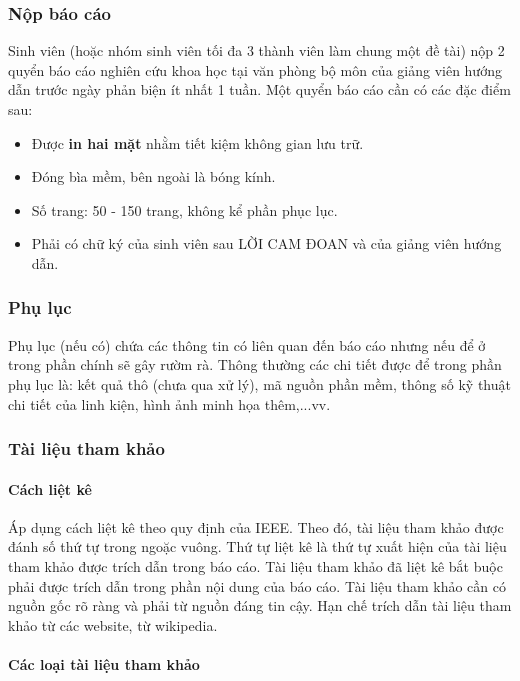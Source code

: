 \documentclass{article} %
\begin{document}
\subsubsection{Nộp báo cáo}
\vspace{-35pt}
Sinh viên (hoặc nhóm sinh viên tối đa 3 thành viên làm chung một đề tài) nộp 2 quyển báo cáo nghiên cứu khoa học tại
văn phòng bộ môn của giảng viên hướng dẫn trước ngày phản biện ít nhất 1 tuần. Một quyển báo cáo cần có các đặc điểm
sau:
\begin{itemize}
    \item Được \textbf{in hai mặt} nhằm tiết kiệm không gian lưu trữ.
    \item Đóng bìa mềm, bên ngoài là bóng kính.
    \item Số trang: 50 - 150 trang, không kể phần phục lục.
    \item Phải có chữ ký của sinh viên sau LỜI CAM ĐOAN và của giảng viên hướng dẫn.
\end{itemize}
\subsubsection{Phụ lục}
\vspace{-35pt}
Phụ lục (nếu có) chứa các thông tin có liên quan đến báo cáo nhưng nếu để ở trong phần chính sẽ gây rườm rà. Thông
thường các chi tiết được để trong phần phụ lục là: kết quả thô (chưa qua xử lý), mã nguồn phần mềm, thông số kỹ thuật
chi tiết của linh kiện, hình ảnh minh họa thêm,...vv.

\subsubsection{Tài liệu tham khảo}
\vspace{-35pt}
\paragraph{Cách liệt kê}\mbox{}

Áp dụng cách liệt kê theo quy định của IEEE. Theo đó, tài liệu tham khảo được đánh số thứ tự trong ngoặc vuông. Thứ
tự liệt kê là thứ tự xuất hiện của tài liệu tham khảo được trích dẫn trong báo cáo. Tài liệu tham khảo đã liệt kê
bắt buộc phải được trích dẫn trong phần nội dung của báo cáo. Tài liệu tham khảo cần có nguồn gốc rõ ràng và phải
từ nguồn đáng tin cậy. Hạn chế trích dẫn tài liệu tham khảo từ các website, từ wikipedia.
\paragraph{Các loại tài liệu tham khảo}\mbox{}
\end{document}
